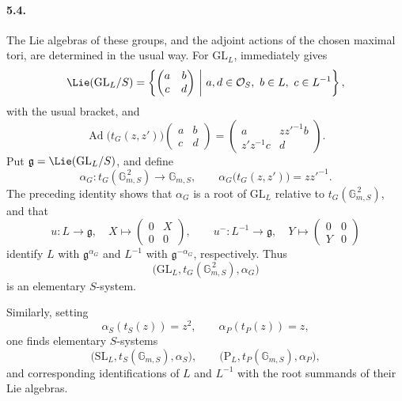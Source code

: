 \paragraph{\textbf{5.4.}}
The Lie algebras of these groups, and the adjoint actions of the
chosen maximal tori, are determined in the usual way.  For
\(\mathrm{GL}_L\),  immediately gives
\[
 \Lie(\mathrm{GL}_L/S)
 =
 \left\{
 \begin{pmatrix}a&b\\c&d\end{pmatrix}
 \ \middle|\
 a,d\in\mathcal O_S,\ b\in L,\ c\in L^{-1}
 \right\},
\]
with the usual bracket, and
\[
 \operatorname{Ad}\bigl(t_G(z,z')\bigr)
 \begin{pmatrix}a&b\\c&d\end{pmatrix}
 =
 \begin{pmatrix}
 a&zz'^{-1}b\\
 z'z^{-1}c&d
 \end{pmatrix}.
\]
Put \(\mathfrak g=\Lie(\mathrm{GL}_L/S)\), and define
\[
 \alpha_G\colon t_G(\mathbb G_{m,S}^{\,2})\longrightarrow
 \mathbb G_{m,S},
 \qquad
 \alpha_G\bigl(t_G(z,z')\bigr)=zz'^{-1}.
\]
The preceding identity shows that \(\alpha_G\) is a root of
\(\mathrm{GL}_L\) relative to \(t_G(\mathbb G_{m,S}^{\,2})\), and
that
\[
 u\colon L\longrightarrow\mathfrak g,
 \quad X\longmapsto\begin{pmatrix}0&X\\0&0\end{pmatrix},
 \qquad
 u^-\colon L^{-1}\longrightarrow\mathfrak g,
 \quad Y\longmapsto\begin{pmatrix}0&0\\Y&0\end{pmatrix}
\]
identify \(L\) with \(\mathfrak g^{\alpha_G}\) and \(L^{-1}\) with
\(\mathfrak g^{-\alpha_G}\), respectively.  Thus
\[
 \bigl(\mathrm{GL}_L,t_G(\mathbb G_{m,S}^{\,2}),\alpha_G\bigr)
\]
is an elementary \(S\)-system.

Similarly, setting
\[
 \alpha_S(t_S(z))=z^2,
 \qquad
 \alpha_P(t_P(z))=z,
\]
one finds elementary \(S\)-systems
\[
 \bigl(\mathrm{SL}_L,t_S(\mathbb G_{m,S}),\alpha_S\bigr),
 \qquad
 \bigl(\mathrm P_L,t_P(\mathbb G_{m,S}),\alpha_P\bigr),
\]
and corresponding identifications of \(L\) and \(L^{-1}\) with the
root summands of their Lie algebras.

